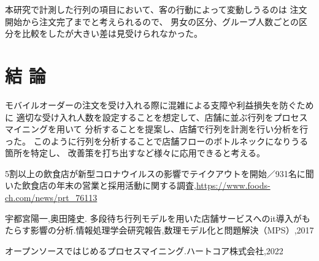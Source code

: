 \documentclass[10pt,twocolumn, a4j]{jsarticle}
\begin{document}
本研究で計測した行列の項目において、客の行動によって変動しうるのは
注文開始から注文完了までと考えられるので、
男女の区分、グループ人数ごとの区分を比較をしたが大きい差は見受けられなかった。


\section{結 論}
モバイルオーダーの注文を受け入れる際に混雑による支障や利益損失を防ぐために
適切な受け入れ人数を設定することを想定して、店舗に並ぶ行列をプロセスマイニングを用いて
分析することを提案し、店舗で行列を計測を行い分析を行った。
このように行列を分析することで店舗フローのボトルネックになりうる箇所を特定し、
改善策を打ち出すなど様々に応用できると考える。



\begin{thebibliography}{1}

  5割以上の飲食店が新型コロナウイルスの影響でテイクアウトを開始／931名に聞いた飲食店の年末の営業と採用活動に関する調査,\url{https://www.foods-ch.com/news/prt_76113}

  宇都宮陽一,奥田隆史. 多段待ち行列モデルを用いた店舗サービスへのit導入がもたらす影響の分析.情報処理学会研究報告,数理モデル化と問題解決（MPS）,2017 

  オープンソースではじめるプロセスマイニング.ハートコア株式会社,2022


\end{thebibliography}





\end{document}

